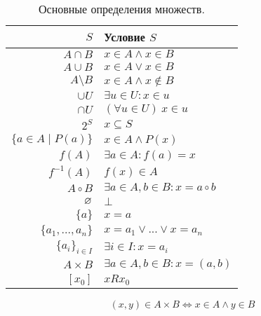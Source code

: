 \begin{table}
	\centering
	\begin{tabular}{r|l}
		$S$                        & Условие $S$                        \\\hline
		$A\cap B$                  & $x\in A\land x\in B$               \\
		$A\cup B$                  & $x\in A\lor x\in B$                \\
		$A\setminus B$             & $x\in A \land x\notin B$           \\
		$\cup U$                   & $\exists u\in U:x\in u$            \\
		$\cap U$                   & $(\forall u\in U)~x\in u$          \\
		$2^{S}$                    & $x\subseteq S$                     \\
		$\{a\in A\;\big|\; P(a)\}$ & $x\in A\land P(x)$                 \\
		$f(A)$                     & $\exists a\in A:f(a)=x$            \\
		$f^{-1}(A)$                & $f(x)\in A$                        \\
		$A\circ B$                 & $\exists a\in A,b\in B:x=a\circ b$ \\
		$\varnothing$                    & $\bot$                             \\
		$\{a\}$                    & $x=a$                              \\
		$\{a_1,...,a_{n}\}$        & $x=a_1\lor ...\lor x=a_{n}$        \\
		$\{a_{i}\}_{i\in I}$       & $\exists i\in I:x=a_{i}$           \\
		$A\times B$                & $\exists a\in A,b\in B:x=(a,b)$    \\
		$[x_0]$                    & $xRx_0$
	\end{tabular}

	\[
		(x,y)\in A\times B\iff x\in A\land y\in B
	\]

	\caption{Основные определения множеств.}\label{table:set_def}
\end{table}
